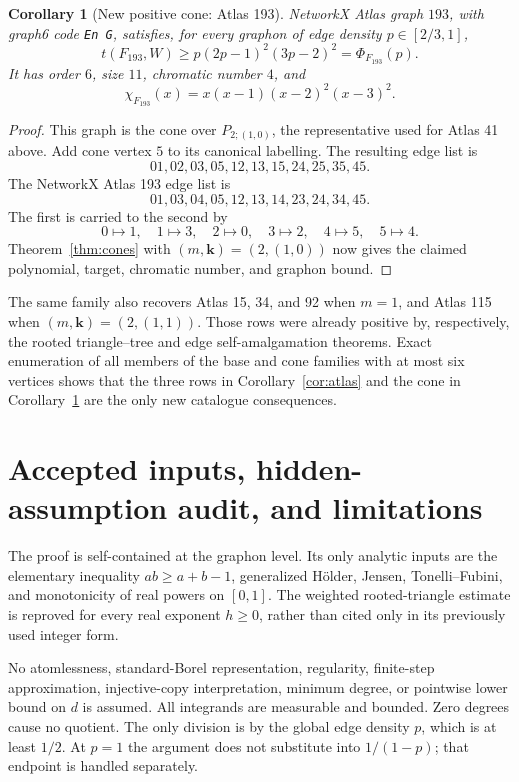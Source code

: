 \documentclass[11pt]{article}
\newtheorem{corollary}[theorem]{Corollary}
\begin{document}
\begin{corollary}[New positive cone: Atlas 193]\label{cor:atlas-cone}
NetworkX Atlas graph $193$, with graph6 code \texttt{En G},
satisfies, for every graphon of edge density $p\in[2/3,1]$,
\[
 t(F_{193},W)
 \geq p(2p-1)^2(3p-2)^2
 =\Phi_{F_{193}}(p).
\]
It has order $6$, size $11$, chromatic number $4$, and
\[
 \chi_{F_{193}}(x)=x(x-1)(x-2)^2(x-3)^2.
\]
\end{corollary}

\begin{proof}
This graph is the cone over
$P_{2;(1,0)}$, the representative used for Atlas 41 above.  Add cone
vertex $5$ to its canonical labelling.  The resulting edge list is
\[
 01,02,03,05,12,13,15,24,25,35,45.
\]
The NetworkX Atlas 193 edge list is
\[
 01,03,04,05,12,13,14,23,24,34,45.
\]
The first is carried to the second by
\[
 0\mapsto1,\quad1\mapsto3,\quad2\mapsto0,\quad
 3\mapsto2,\quad4\mapsto5,\quad5\mapsto4.
\]
Theorem~\ref{thm:cones} with $(m,\mathbf{k})=(2,(1,0))$ now gives
the claimed polynomial, target, chromatic number, and graphon bound.
\end{proof}

The same family also recovers Atlas 15, 34, and 92 when $m=1$, and
Atlas 115 when $(m,\mathbf{k})=(2,(1,1))$.  Those rows were already
positive by, respectively, the rooted triangle--tree and edge
self-amalgamation theorems.  Exact enumeration of all members of the
base and cone families with at most six vertices shows that the three
rows in Corollary~\ref{cor:atlas} and the cone in
Corollary~\ref{cor:atlas-cone} are the only new catalogue consequences.


\section{Accepted inputs, hidden-assumption audit, and limitations}

The proof is self-contained at the graphon level.  Its only analytic
inputs are the elementary inequality $ab\geq a+b-1$, generalized
H\"older, Jensen, Tonelli--Fubini, and monotonicity of real powers on
$[0,1]$.  The weighted rooted-triangle estimate is reproved for every
real exponent $h\geq0$, rather than cited only in its previously used
integer form.

No atomlessness, standard-Borel representation, regularity,
finite-step approximation, injective-copy interpretation, minimum
degree, or pointwise lower bound on $d$ is assumed.  All integrands are
measurable and bounded.  Zero degrees cause no quotient.  The only
division is by the global edge density $p$, which is at least $1/2$.
At $p=1$ the argument does not substitute into $1/(1-p)$; that endpoint
is handled separately.
\end{document}
